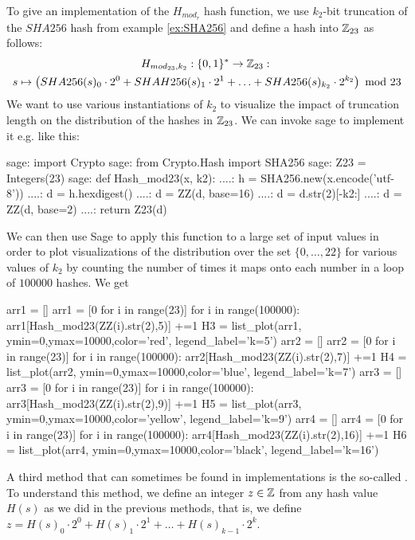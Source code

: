 \begin{example} To give an implementation of the $H_{mod_r}$ hash function, we use  $k_2$-bit truncation of the $SHA256$ hash from example \ref{ex:SHA256} and define a hash into $\mathbb{Z}_{23}$ as follows:
\begin{multline*}
H_{mod_{23},k_2}: \{0,1\}^* \to \mathbb{Z}_{23}:\; \\
s\mapsto
\left(SHA256(s)_0\cdot 2^0 + SHAH256(s)_1\cdot 2^1 + \ldots + SHA256(s)_{k_2}\cdot 2^{k_2}\right) \text{ mod } 23 
\end{multline*}
We want to use various instantiations of $k_2$ to visualize the impact of truncation length on the distribution of the hashes in $\mathbb{Z}_{23}$. We can invoke sage to implement it e.g. like this:
\begin{sagecommandline}
sage: import Crypto 
sage: from Crypto.Hash import SHA256
sage: Z23 = Integers(23)
sage: def Hash_mod23(x, k2):
....:     h = SHA256.new(x.encode('utf-8'))
....:     d = h.hexdigest()
....:     d = ZZ(d, base=16)
....:     d = d.str(2)[-k2:]
....:     d = ZZ(d, base=2)
....:     return Z23(d)
\end{sagecommandline}
We can then use Sage to apply this function to a large set of input values in order to plot visualizations of the distribution over the set $\{0,\ldots,22\}$ for various values of $k_2$ by counting the number of times it maps onto each number in a loop of $100000$ hashes. We get
\begin{sagesilent}
arr1 = []
arr1 = [0 for i in range(23)]
for i in range(100000):
    arr1[Hash_mod23(ZZ(i).str(2),5)] +=1
H3 = list_plot(arr1, ymin=0,ymax=10000,color='red', legend_label='k=5')
arr2 = []
arr2 = [0 for i in range(23)]
for i in range(100000):
    arr2[Hash_mod23(ZZ(i).str(2),7)] +=1
H4 = list_plot(arr2, ymin=0,ymax=10000,color='blue', legend_label='k=7')
arr3 = []
arr3 = [0 for i in range(23)]
for i in range(100000):
    arr3[Hash_mod23(ZZ(i).str(2),9)] +=1
H5 = list_plot(arr3, ymin=0,ymax=10000,color='yellow', legend_label='k=9')
arr4 = []
arr4 = [0 for i in range(23)]
for i in range(100000):
    arr4[Hash_mod23(ZZ(i).str(2),16)] +=1
H6 = list_plot(arr4, ymin=0,ymax=10000,color='black', legend_label='k=16')
\end{sagesilent}
\begin{center} 
\end{center}
\end{example}
A third method that can sometimes be found in implementations is the so-called . To understand this method, we define an integer $z\in\mathbb{Z}$ from any hash value $H(s)$ as we did in the previous methods, that is, we define $z = H(s)_0\cdot 2^0 + H(s)_1\cdot 2^1 + \ldots + H(s)_{k-1}\cdot 2^{k}$. 

